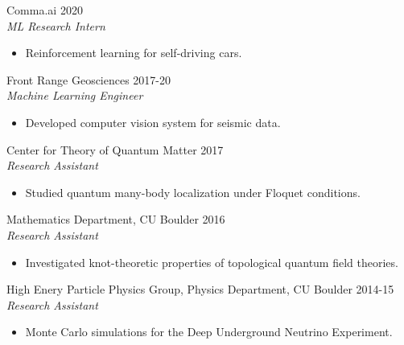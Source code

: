 \documentclass[margin]{res}
\begin{document}
\begin{resume}
                 Comma.ai \hfill            2020 \\
		{\sl ML Research Intern}
                 \begin{itemize}  \itemsep -2pt %
                 \item Reinforcement learning for self-driving cars.
                 \end{itemize}

               Front Range Geosciences \hfill            2017-20 \\
                 {\sl Machine Learning Engineer}
                 \begin{itemize}  \itemsep -2pt %
                 \item Developed computer vision system for seismic data.
                 \end{itemize}
                 Center for Theory of Quantum Matter \hfill            2017 \\
		{\sl Research Assistant}
                 \begin{itemize}  \itemsep -2pt %
                 \item Studied quantum many-body localization under Floquet conditions.
                 \end{itemize}

                Mathematics Department, CU Boulder \hfill            2016 \\
		 {\sl Research Assistant}
                 \begin{itemize}  \itemsep -2pt %
                 \item Investigated knot-theoretic properties of topological quantum field theories.
                 \end{itemize}

                High Enery Particle Physics Group, Physics Department, CU Boulder  \hfill            2014-15 \\
		{\sl Research Assistant}
                 \begin{itemize}  \itemsep -2pt %
                 \item Monte Carlo simulations for the Deep Underground Neutrino Experiment.
                 \end{itemize}


\end{resume}
\end{document}
